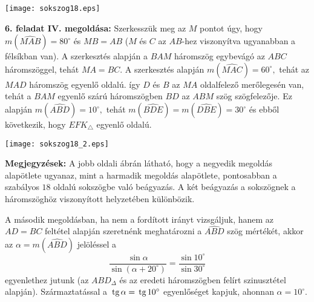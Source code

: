 \documentclass[a4paper,10pt]{article}
\def\tg{\, \hbox{tg} \,}
\begin{document}
\centerline{\texttt{[image: sokszog18.eps]}}

\medskip


\textbf{6. feladat IV. megoldása: } Szerkesszük meg az $M$ pontot
úgy, hogy \linebreak $m(\widehat{MAB})=80^{\circ}$ és $MB=AB$
($M$ és $C$ az $AB$-hez viszonyítva ugyanabban a félsíkban
van). A szerkesztés alapján a $BAM$ háromszög egybevágó
az $ABC$ háromszöggel, tehát $MA=BC.$ A szerkesztés
alapján $m(\widehat{MAC})=60^{\circ},$ tehát az $MAD$
háromszög egyenlő oldalú. így $D$ és $B$ az $MA$
oldalfelező merőlegesén van, tehát a $BAM$ egyenlő
szárú háromszögben $BD$ az $ABM$ szög szögfelezője.
Ez alapján  $m(\widehat{ABD})=10^{\circ},$ tehát
$m(\widehat{BDE})= m(\widehat{DBE})=30^{\circ}$ és ebből
következik, hogy $EFK_{\triangle}$ egyenlő oldalú.

\centerline{\texttt{[image: sokszog18\_2.eps]}}

\medskip

\textbf{Megjegyzések: } A jobb oldali ábrán látható, hogy a negyedik megoldás alapötlete ugyanaz, mint a
harmadik megoldás alapöt\-lete, pontosabban a szabályos $18$
oldalú sokszögbe való beágyazás. A két beágyazás a
sokszögnek a háromszöghöz viszonyított hely\-zetében
különbözik.

\smallskip
A második megoldásban, ha nem a fordított irányt
vizsgáljuk, hanem az $AD=BC$ feltétel alapján szeretnénk
meghatározni a $\widehat{ABD}$ szög mértékét, akkor az
$\alpha=m(\widehat{ABD})$ jelöléssel a $$\frac{\sin
\alpha}{\sin(\alpha+20^{\circ})}=\frac{\sin 10^{\circ}}{\sin
30^{\circ}}$$ egyenlethez jutunk (az $ABD_{\Delta}$ és az eredeti
háromszögben felírt szinusztétel alapján).
Származtatással a $\tg \alpha=\tg 10^{\circ}$ egyenlőséget
kapjuk, ahonnan $\alpha=10^{\circ}.$
\end{document}
